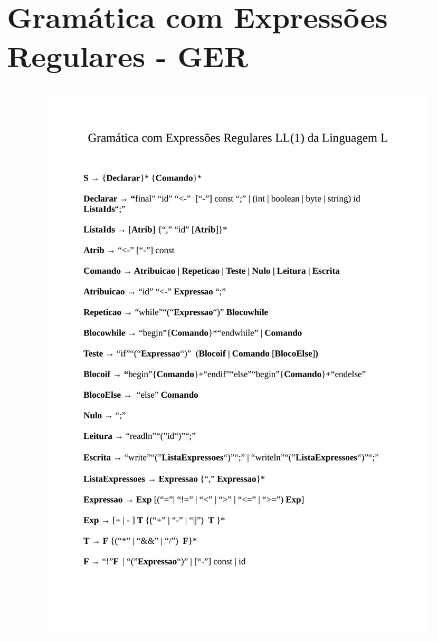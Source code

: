 \section{\esp Gramática com Expressões Regulares - GER}
\begin{center}    
\begin{figure}[!ht]
	\vspace{0.2cm}
	\includegraphics[width=0.9\textwidth]{figuras/GER_LL1-1.png}
	 \vspace{0.2cm}
	\label{fig:figura1}
\end{figure}
\vspace{0.2cm}
\end{center}
% 
